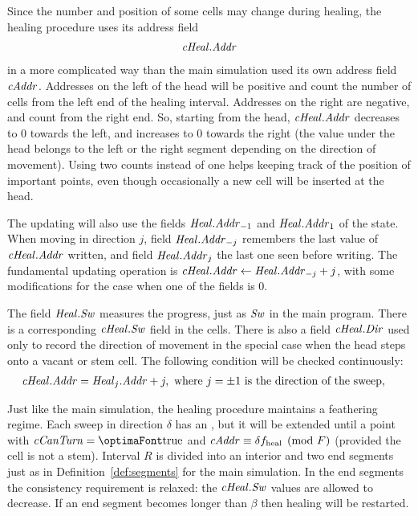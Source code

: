 \documentclass[12pt]{memoir}
\newcommand{\authnote}[3]
{\text{{ \textcolor{#3}{\( \langle\hspace{-0.2em}\langle \)\textsf{\footnotesize #1: #2}\( \rangle\hspace{-0.2em}\rangle \)}}}}
\newcommand{\authnote}[2]{}
\newcommand{\Pnote}[1]{{\authnote{P}{#1}{cyan}}}
\newcommand{\fld}[1]{\ensuremath{\textit{#1\/}}}
\newcommand{\tHeal}{f_{\mathrm{heal}}}
\newcommand{\R}{R}
\newcommand{\F}{F}
\newcommand{\Addr}{\fld{Addr}}
\newcommand{\cAddr}{\fld{cAddr}}
\newcommand{\cCanTurn}{\fld{cCanTurn}}
\newcommand{\Dir}{\fld{Dir}}
\newcommand{\Heal}{\fld{Heal}}
\newcommand{\cHeal}{\fld{cHeal}}
\newcommand{\Sweep}{\fld{Sw}}
\begin{document}
Since the number and position of some cells may change during healing, 
the healing procedure uses its address field
 \begin{align*}
 \cHeal.\Addr 
 \end{align*}
in a more complicated way than the main simulation used its own address field \( \cAddr \).
Addresses on the left of the head will be positive and count
the number of cells from the left end of the healing interval.
Addresses on the right are negative, and count from the right end.
So, starting from the head, \( \cHeal.\Addr \) decreases to 0 towards the left, 
and increases to 0 towards the right (the value under the head belongs to
the left or the right segment depending on the direction of movement).
Using two counts instead of one helps keeping track of the position of important points,
even though occasionally a new cell will be inserted at the head.

The updating will also use the fields
\( \Heal.\Addr_{-1} \) and \( \Heal.\Addr_{1} \) of the state.
When moving in direction \( j \), field \( \Heal.\Addr_{-j} \) remembers the last
value of \( \cHeal.\Addr \) written, and field \( \Heal.\Addr_{j} \) the last one seen 
before writing.
The fundamental updating operation is \( \cHeal.\Addr\gets\Heal.\Addr_{-j}+j \),
with some modifications for the case when one of the fields is 0. \Pnote{!}

The field \( \Heal.\Sweep \) 
measures the progress, just as \( \Sweep \) in the main program.
There is a corresponding \( \cHeal.\Sweep \) field in the cells.
There is also a field \( \cHeal.\Dir \) used only to record the direction
of movement in the special case when the head steps onto a vacant or stem cell.
The following condition will be checked continuously:
\begin{align*}
   \cHeal.\Addr   &= \Heal_{j}.\Addr + j, \text{ where } j = \pm 1  \text{ is the direction of the sweep},
 \end{align*}

Just like the main simulation, the healing procedure maintains a feathering regime.
Each sweep in direction \( \delta \) has an , but it
will be extended until a point with \( \cCanTurn=\true \) and 
\( \cAddr\equiv \delta\tHeal \pmod{\F}\) (provided the cell is not a stem).
Interval \( \R \) is divided into an interior and two end segments just as in
Definition~\ref{def:segments} for the main simulation.
In the end segments
the consistency requirement is relaxed: the \( \cHeal.\Sweep \) values are
allowed to decrease.
If an end segment becomes longer than \( \beta \) then healing will be restarted.
\end{document}
